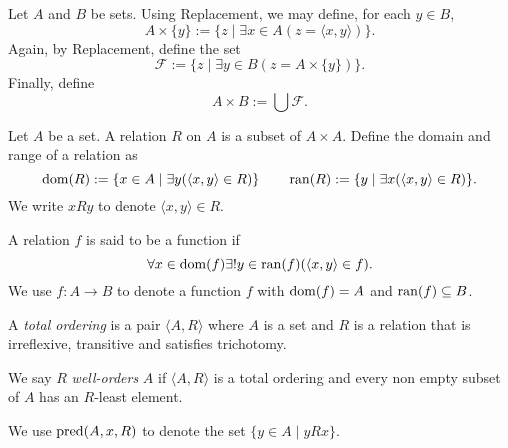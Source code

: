 \begin{definition}
    Let $A$ and $B$ be sets. Using Replacement, we may define, for each $y\in B$, 
    \begin{equation*}
        A\times\{y\} := \{z\mid\exists x\in A (z = \langle x,y\rangle)\}.
    \end{equation*}
    Again, by Replacement, define the set 
    \begin{equation*}
        \mathscr F := \{z\mid\exists y\in B(z = A\times\{y\})\}.
    \end{equation*}
    Finally, define 
    \begin{equation*}
        A\times B := \bigcup\mathscr F.
    \end{equation*}
\end{definition}

\begin{definition}
    Let $A$ be a set. A relation $R$ on $A$ is a subset of $A\times A$. Define the domain and range of a relation as 
    \begin{equation*}
        \operatorname{dom}(R) := \{x\in A\mid\exists y(\langle x, y\rangle\in R)\}\qquad\operatorname{ran}(R) := \{y\mid\exists x(\langle x, y\rangle\in R)\}.
    \end{equation*}
    We write $x R y$ to denote $\langle x,y\rangle\in R$.

    A relation $f$ is said to be a function if 
    \begin{equation*}
        \forall x\in\operatorname{dom}(f)\exists! y\in\operatorname{ran}(f)(\langle x,y\rangle\in f).
    \end{equation*}
    We use $f: A\to B$ to denote a function $f$ with $\operatorname{dom}(f) = A$ and $\operatorname{ran}(f)\subseteq B$.
\end{definition}

\begin{definition}
    A \emph{total ordering} is a pair $\langle A, R\rangle$ where $A$ is a set and $R$ is a relation that is irreflexive, transitive and satisfies trichotomy. 

    We say $R$ \emph{well-orders} $A$ if $\langle A,R\rangle$ is a total ordering and every non empty subset of $A$ has an $R$-least element.
\end{definition}

We use $\operatorname{pred}(A,x,R)$ to denote the set $\{y\in A\mid y R x\}$.

